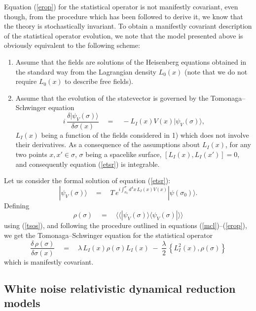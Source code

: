 \documentclass[12pt]{article}
\newcommand{\llangle}{\langle\!\langle}
\newcommand{\rrangle}{\rangle\!\rangle}
\begin{document}
Equation (\ref{erop}) for the statistical operator is not
manifestly covariant, even though, from the procedure which has
been followed to derive it, we know that the theory is
stochastically invariant. To obtain a manifestly covariant
description of the statistical operator evolution, we note that
the model presented above is obviously equivalent to the following
scheme:
\begin{enumerate}
\item Assume that the fields are solutions of the Heisenberg
equations obtained in the standard way from the Lagrangian density
$L_{0}(x)$ (note that we do not require $L_{0}(x)$ to describe
free fields).
\item Assume that the evolution of the statevector is governed by
the Tomonaga--Schwinger equation
\begin{equation} \label{etsr}
i\,\frac{\delta |\psi_{V}(\sigma)\rangle}{\delta\sigma(x)} \quad =
\quad - L_{I}(x)V(x) |\psi_{V}(\sigma)\rangle,
\end{equation}
$L_{I}(x)$ being a function of the fields considered in 1) which
does not involve their derivatives. As a consequence of the
assumptions about $L_{I}(x)$, for any two points $x, x' \in
\sigma$, $\sigma$ being a spacelike surface, $[L_{I}(x),
L_{I}(x')] = 0$, and consequently equation (\ref{etsr}) is
integrable.
\end{enumerate}

Let us consider the formal solution of equation (\ref{etsr}):
\begin{equation}
|\psi_{V}(\sigma)\rangle \quad = \quad T\, e^{\displaystyle
i\int_{\sigma_{0}}^{\sigma} d^{4}x\, L_{I}(x) V(x)}
|\psi(\sigma_{0})\rangle.
\end{equation}
Defining
\begin{equation} \label{tsos}
\rho(\sigma) \quad = \quad \llangle|\psi_{V}(\sigma)\rangle
\langle\psi_{V}(\sigma)|\rrangle
\end{equation}
using (\ref{tsos}), and following the procedure outlined in
equations (\ref{mcl})--(\ref{erop}), we get the
Tomonaga--Schwinger equation for the statistical operator
\begin{equation} \label{cuat}
\frac{\delta\, \rho(\sigma)}{\delta\sigma(x)} \quad = \quad
\lambda\, L_{I}(x) \rho(\sigma) L_{I}(x) \; - \;
\frac{\lambda}{2}\, \left\{ L_{I}^{2}(x), \rho(\sigma) \right\}
\end{equation}
which is manifestly covariant.


\subsection{White noise relativistic dynamical reduction models}
\label{sec93}
\end{document}
